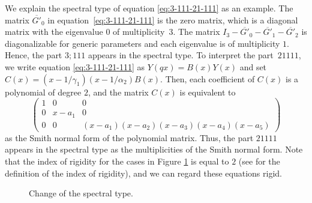 \documentclass[pdftex]{sigma}
\numberwithin{equation}{section}
\theoremstyle{definition}
\begin{document}
We explain the spectral type of equation \eqref{eq:3-111-21-111} as an example.
The matrix $\overline{G'}_0 $ in equation~\eqref{eq:3-111-21-111} is the zero matrix, which is a diagonal matrix with the eigenvalue $0$ of multiplicity~$3$.
The matrix $I_3 - \overline{G'}_0 -\overline{G'}_1 -\overline{G'}_2 $ is diagonalizable for generic parameters and each eigenvalue is of multiplicity $1$.
Hence, the part $3;111$ appears in the spectral type.
To interpret the part~$21111$, we write equation \eqref{eq:3-111-21-111} as $Y(qx)=B(x) Y(x)$ and set $C(x)= (x-1/\gamma _1) (x-1/\alpha _2 ) B(x)$.
Then, each coefficient of $C(x)$ is a polynomial of degree $2$, and the matrix $C(x)$ is equivalent to
\begin{equation*}
\begin{pmatrix}
 1 & 0 & 0 \\
 0 & x-a_1 & 0 \\
 0 & 0 & (x-a_1) (x-a_2)(x-a_3)(x-a_4)(x-a_5)
 \end{pmatrix}
\end{equation*}
as the Smith normal form of the polynomial matrix.
Thus, the part $21111$ appears in the spectral type as the multiplicities of the Smith normal form.
Note that the index of rigidity for the cases in Figure \ref{fg:spectraltype} is equal to $2$ (see \cite{SY} for the definition of the index of rigidity), and we can regard these equations rigid.
\begin{figure}[t]
\centering
{}
\caption{Change of the spectral type.}\label{fg:spectraltype}
\end{figure}
\end{document}
